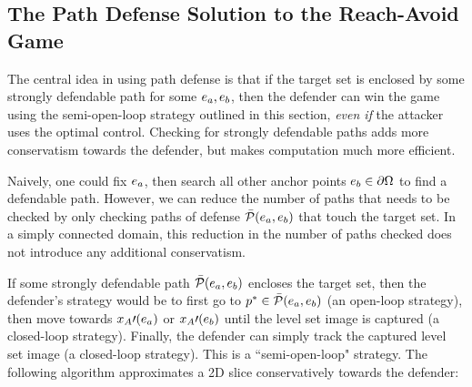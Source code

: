 \subsection{The Path Defense Solution to the Reach-Avoid Game}
\label{subsec:reach_avoid}
The central idea in using path defense is that if the target set is enclosed by some strongly defendable path for some $e_a,e_b$, then the defender can win the game using the semi-open-loop strategy outlined in this section, \textit{even if} the attacker uses the optimal control. Checking for strongly defendable paths adds more conservatism towards the defender, but makes computation much more efficient.

Naively, one could fix $e_a$, then search all other anchor points $e_b\in\partial\Omega$ to find a defendable path. However, we can reduce the number of paths that needs to be checked by only checking paths of defense $\bar{\mathcal{P}}(e_a,e_b)$ that touch the target set. In a simply connected domain, this reduction in the number of paths checked does not introduce any additional conservatism. 



If some strongly defendable path $\bar{\mathcal{P}}(e_a,e_b)$ encloses the target set, then the defender's strategy would be to first go to $p^*\in\bar{\mathcal{P}}(e_a,e_b)$ (an open-loop strategy), then move towards $x_A\prime(e_a)$ or $x_A\prime(e_b)$ until the level set image is captured (a closed-loop strategy). Finally, the defender can simply track the captured level set image (a closed-loop strategy). This is a ``semi-open-loop" strategy. The following algorithm approximates a 2D slice conservatively towards the defender:

